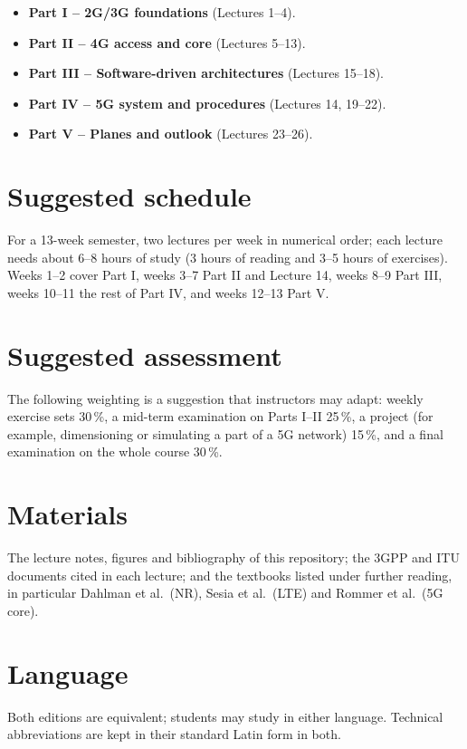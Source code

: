 \documentclass[11pt,a4paper]{article}
\begin{document}
\begin{itemize}
  \item \textbf{Part I -- 2G/3G foundations} (Lectures 1--4).
  \item \textbf{Part II -- 4G access and core} (Lectures 5--13).
  \item \textbf{Part III -- Software-driven architectures} (Lectures 15--18).
  \item \textbf{Part IV -- 5G system and procedures} (Lectures 14, 19--22).
  \item \textbf{Part V -- Planes and outlook} (Lectures 23--26).
\end{itemize}

\section{Suggested schedule}
For a 13-week semester, two lectures per week in numerical order; each lecture needs about 6--8 hours of study (3 hours of reading and 3--5 hours of
exercises). Weeks 1--2 cover Part I, weeks 3--7 Part II and Lecture 14, weeks 8--9 Part III, weeks 10--11 the rest of Part IV, and weeks 12--13 Part V.

\section{Suggested assessment}
The following weighting is a suggestion that instructors may adapt: weekly exercise sets 30\,\%, a mid-term examination on Parts I--II 25\,\%, a
project (for example, dimensioning or simulating a part of a 5G network) 15\,\%, and a final examination on the whole course 30\,\%.

\section{Materials}
The lecture notes, figures and bibliography of this repository; the 3GPP and ITU documents cited in each lecture; and the textbooks listed under
further reading, in particular Dahlman et al.\ (NR), Sesia et al.\ (LTE) and Rommer et al.\ (5G core).

\section{Language}
Both editions are equivalent; students may study in either language. Technical abbreviations are kept in their standard Latin form in both.
\end{document}
